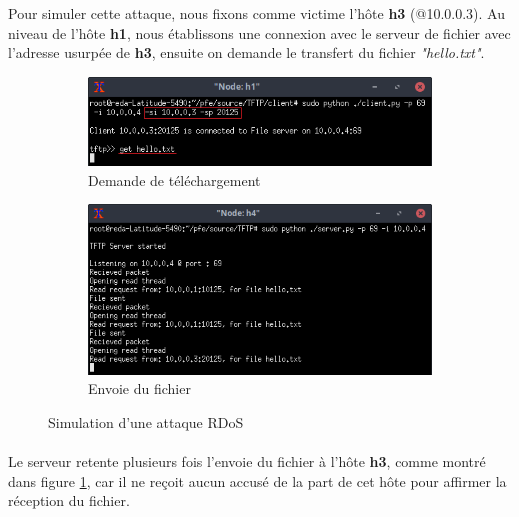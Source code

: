\noindent Pour simuler cette attaque, nous fixons comme victime l'hôte \textbf{h3} (@10.0.0.3). Au niveau de l'hôte \textbf{h1}, nous établissons une connexion avec le serveur de fichier avec l'adresse usurpée de \textbf{h3}, ensuite on demande le transfert du fichier \textit{"hello.txt"}.\\
\begin{figure}[h]
\centering
\begin{subfigure}{13cm}
\centering
\includegraphics[width=\textwidth]{Figures/simulation/mininet/TFTP/client/attack}
\caption{Demande de téléchargement}
\end{subfigure}
\vskip 0.4cm
\begin{subfigure}{13cm}
\centering
\includegraphics[width=\textwidth]{Figures/simulation/mininet/TFTP/server/attack_request}
\caption{Envoie du fichier}
\label{fig:send}
\end{subfigure}
\vskip 0.3cm
\decoRule
\caption{Simulation d'une attaque RDoS}
\label{fig:rdos_simulation}
\end{figure}
\paragraph{}
Le serveur retente plusieurs fois l'envoie du fichier à l'hôte \textbf{h3}, comme montré dans figure \ref{fig:send}, car il ne reçoit aucun accusé de la part de cet hôte pour affirmer la réception du fichier.\\

